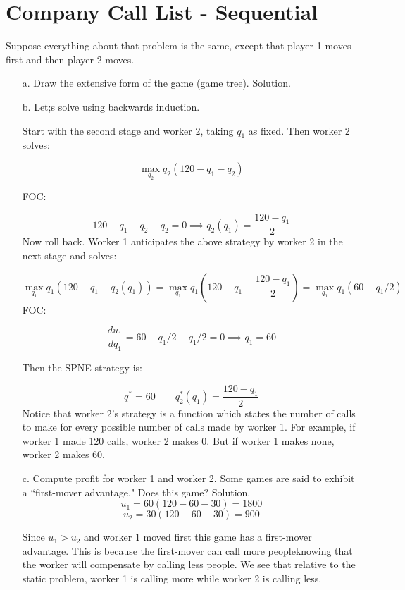 \documentclass{article}
\begin{document}
  \section{Company Call List - Sequential}      
Suppose everything about that problem is the same, except that player 1 moves first and then player 2 moves.
    \begin{enumerate}
        \item[a.] Draw the extensive form of the game (game tree).
         Solution.

            
        \item[b.] Let;s solve using backwards induction.

           Start with the second stage and worker 2, taking $q_1$ as fixed. Then worker 2 solves:
           
           \[\max_{q_2} q_2 (120-q_1-q_2) \]
           
           FOC:
           
           \[120-q_1-q_2-q_2=0 \implies q_2(q_1) = \frac{120-q_1}{2} \]
           Now roll back. Worker 1 anticipates the above strategy by worker 2 in the next stage and solves:
           
           \[\max_{q_1} q_1(120-q_1-q_2(q_1)) = \max_{q_1} q_1(120-q_1-\frac{120-q_1}{2}) =   \max_{q_1} q_1(60-q_1/2)\]
           FOC:
           
           \[\frac{du_1}{d q_1} = 60 -q_1/2-q_1/2=0 \implies q_1=60 \]
           
           Then the SPNE strategy is:
           
           \[q^* = 60 \qquad q_2^*(q_1) = \frac{120-q_1}{2} \]
           Notice that worker 2's strategy is a function which states the number of calls to make for every possible number of calls made by worker 1. For example, if worker 1 made 120 calls, worker 2 makes 0. But if worker 1 makes none, worker 2 makes 60.
           

        
        \item[c.] Compute profit for worker 1 and worker 2. Some games are said to exhibit a ``first-mover advantage." Does this game?
         Solution.
         \[u_1 = 60(120-60-30) = 1800 \]
         \[u_2 = 30(120-60-30) = 900 \]
         
         Since $u_1>u_2$ and worker 1 moved first this game has a first-mover advantage. This is because the first-mover can call more peopleknowing that the worker will compensate by calling less people. We see that relative to the static problem, worker 1 is calling more  while worker 2 is calling less.
         
         
  
        
    \end{enumerate}
\end{document}
